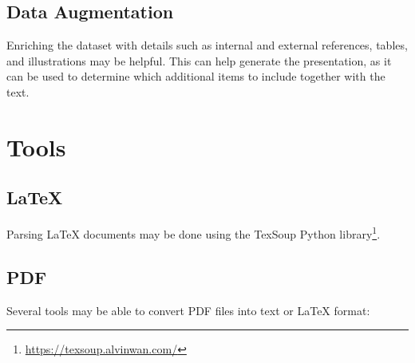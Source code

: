 \subsection{Data Augmentation}
Enriching the dataset with details such as internal and external references, tables, and illustrations may be helpful. This can help generate the presentation, as it can be used to determine which additional items to include together with the text.


\section{Tools}

\subsection{\LaTeX{}}
Parsing \LaTeX{} documents may be done using the TexSoup Python library\footnote{\url{https://texsoup.alvinwan.com/}}.

\subsection{PDF}
Several tools may be able to convert PDF files into text or \LaTeX{} format: 

